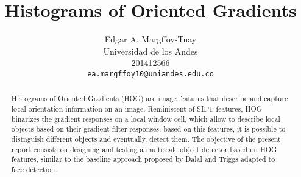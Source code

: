 \documentclass[10pt,twocolumn,letterpaper]{article}
\begin{document}
\title{Histograms of Oriented Gradients}

\author{Edgar A. Margffoy-Tuay\\
Universidad de los Andes\\
201412566\\
{\tt\small ea.margffoy10@uniandes.edu.co}
}

\maketitle

\begin{abstract}
Histograms of Oriented Gradients (HOG) are image features that describe and capture local orientation information on an image. Reminiscent of SIFT features, HOG binarizes the gradient responses on a local window cell, which allow to describe local objects based on their gradient filter responses, based on this features, it is possible to distnguish different objects and eventually, detect them. The objective of the present report consists on designing and testing a multiscale object detector based on HOG features, similar to the baseline approach proposed by Dalal and Triggs adapted to face detection. 
\end{abstract}


\end{document}
